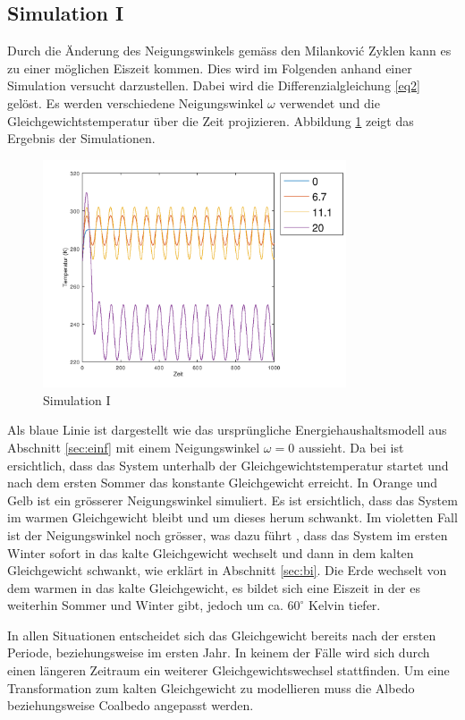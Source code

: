 \begin{refsection}
\subsection{Simulation I} \label{sec:sim1}
Durch die Änderung des Neigungswinkels gemäss den Milankovi\'c
Zyklen kann es zu einer möglichen Eiszeit kommen. Dies wird im
Folgenden anhand einer Simulation versucht darzustellen. Dabei wird
die Differenzialgleichung \eqref{eq2} gelöst. Es werden verschiedene
Neigungswinkel $\omega$ verwendet und die Gleichgewichtstemperatur
über die Zeit projizieren. Abbildung \ref{fig:abb9} zeigt das
Ergebnis der Simulationen.
%
\begin{figure}
	\centering
	\includegraphics[width= 0.8\textwidth]{neigung/Zeitachse_0.png}
	\caption[Simulation I]{Simulation I}
	\label{fig:abb9}
\end{figure}
%
Als blaue Linie ist dargestellt wie das ursprüngliche
Energiehaushaltsmodell aus Abschnitt \ref{sec:einf} mit einem
Neigungswinkel $\omega=0$ aussieht. Da bei ist ersichtlich, dass
das System unterhalb der Gleichgewichtstemperatur startet und nach
dem ersten Sommer das konstante Gleichgewicht erreicht. In Orange
und Gelb ist ein grösserer Neigungswinkel simuliert. Es ist
ersichtlich, dass das System im warmen Gleichgewicht bleibt und um
dieses herum schwankt. Im violetten Fall ist der Neigungswinkel noch
grösser, was dazu führt , dass das System im ersten Winter sofort
in das kalte Gleichgewicht wechselt und dann in dem kalten Gleichgewicht
schwankt, wie erklärt in Abschnitt \ref{sec:bi}. Die Erde wechselt
von dem warmen in das kalte Gleichgewicht, es bildet sich eine
Eiszeit in der es weiterhin Sommer und Winter gibt, jedoch um ca.
$60 ^\circ$ Kelvin tiefer.

In allen Situationen entscheidet sich das Gleichgewicht bereits
nach der ersten Periode, beziehungsweise im ersten Jahr. In keinem
der Fälle wird sich durch einen längeren Zeitraum ein weiterer
Gleichgewichtswechsel stattfinden. Um eine Transformation zum kalten
Gleichgewicht zu modellieren muss die Albedo beziehungsweise Coalbedo
angepasst werden.



\end{refsection}
